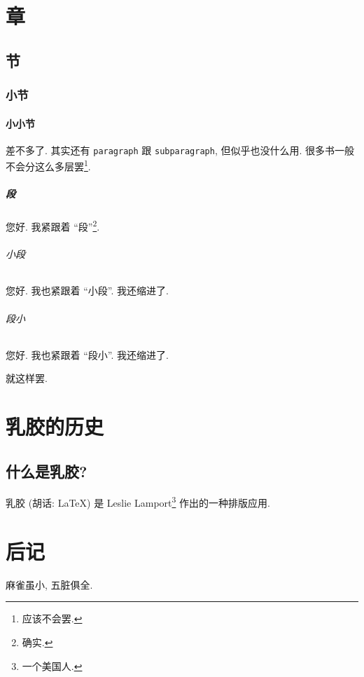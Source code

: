 \documentclass[fontset=fandol]{ctexbook}
\begin{document}
\chapter{章}

\section{节}

\subsection{小节}

\subsubsection{小小节}

差不多了.
其实还有 \verb|paragraph| 跟 \verb-subparagraph-,
但似乎也没什么用.
很多书一般不会分这么多层罢\footnote{应该不会罢.}.

\paragraph{段}

您好. 我紧跟着 ``段''\footnote{确实.}.

\subparagraph{小段}

您好. 我也紧跟着 ``小段''. 我还缩进了.

\subparagraph{段小}

您好. 我也紧跟着 ``段小''. 我还缩进了.

\clearpage

就这样罢.

\appendix

\chapter{乳胶的历史}

\section{什么是乳胶?}

乳胶 (胡话: \LaTeX{}) 是
Leslie Lamport\footnote{一个美国人.}
作出的一种排版应用.

\backmatter

\chapter{后记}

麻雀虽小, 五脏俱全.
\end{document}
